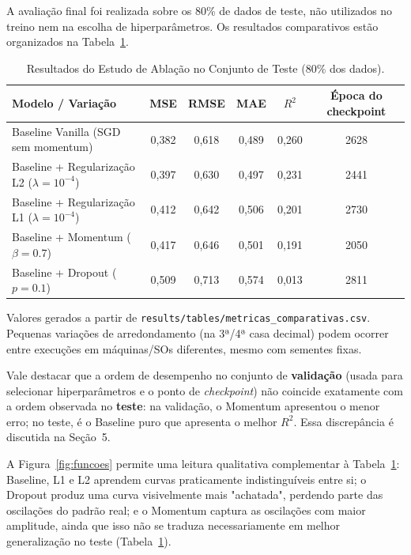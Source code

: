 \documentclass[11pt,a4paper]{article}
\begin{document}
A avaliação final foi realizada sobre os 80\% de dados de teste, não utilizados no treino nem na escolha de hiperparâmetros. Os resultados comparativos estão organizados na Tabela~\ref{tab:ablation_metrics}.

\begin{table}[h]
\centering
\small
\caption{Resultados do Estudo de Ablação no Conjunto de Teste (80\% dos dados).}
\label{tab:ablation_metrics}
\begin{tabularx}{\textwidth}{lccccc}
\toprule
\textbf{Modelo / Variação} & \textbf{MSE} & \textbf{RMSE} & \textbf{MAE} & \textbf{$R^2$} & \textbf{Época do checkpoint} \\
\midrule
Baseline Vanilla (SGD sem momentum)         & 0,382 & 0,618 & 0,489 & 0,260 & 2628 \\
Baseline + Regularização L2 ($\lambda=10^{-4}$) & 0,397 & 0,630 & 0,497 & 0,231 & 2441 \\
Baseline + Regularização L1 ($\lambda=10^{-4}$) & 0,412 & 0,642 & 0,506 & 0,201 & 2730 \\
Baseline + Momentum ($\beta = 0.7$)           & 0,417 & 0,646 & 0,501 & 0,191 & 2050 \\
Baseline + Dropout ($p = 0.1$)                & 0,509 & 0,713 & 0,574 & 0,013 & 2811 \\
\bottomrule
\end{tabularx}

\vspace{0.3em}
\footnotesize\textcolor{blue!70!black}{Valores gerados a partir de \texttt{results/tables/metricas\_comparativas.csv}. Pequenas variações de arredondamento (na 3ª/4ª casa decimal) podem ocorrer entre execuções em máquinas/SOs diferentes, mesmo com sementes fixas.}
\end{table}

Vale destacar que a ordem de desempenho no conjunto de \textbf{validação} (usada para selecionar hiperparâmetros e o ponto de \textit{checkpoint}) não coincide exatamente com a ordem observada no \textbf{teste}: na validação, o Momentum apresentou o menor erro; no teste, é o Baseline puro que apresenta o melhor $R^2$. Essa discrepância é discutida na Seção~5.

A Figura~\ref{fig:funcoes} permite uma leitura qualitativa complementar à Tabela~\ref{tab:ablation_metrics}: Baseline, L1 e L2 aprendem curvas praticamente indistinguíveis entre si; o Dropout produz uma curva visivelmente mais "achatada", perdendo parte das oscilações do padrão real; e o Momentum captura as oscilações com maior amplitude, ainda que isso não se traduza necessariamente em melhor generalização no teste (Tabela~\ref{tab:ablation_metrics}).
\end{document}
